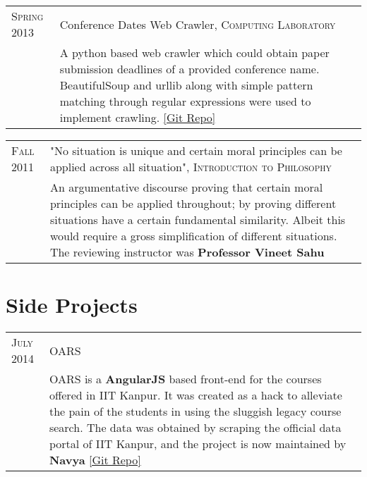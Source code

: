 \documentclass[a4paper,10pt]{article} %
\begin{document}
\begin{tabular}{>{\raggedleft}p{2.2cm}|p{15cm}}
    \textsc{Spring 2013} & Conference Dates Web Crawler, \textsc{Computing Laboratory} \\
                         & \footnotesize{A python based web crawler which could obtain paper submission
                            deadlines of a provided conference name.  BeautifulSoup and urllib along
                            with simple pattern matching through regular expressions were used to implement crawling.
                            \href{https://github.com/srijanshetty/crawler} {[Git Repo]} } \\
\end{tabular}

\begin{tabular}{>{\raggedleft}p{2.2cm}|p{15cm}}
    \textsc{Fall 2011} & "No situation is unique and certain moral principles can be applied across all situation",
                         \textsc{Introduction to Philosophy} \\
                       & \footnotesize{ An argumentative discourse proving that certain moral principles
                         can be applied throughout; by proving different situations have a certain
                         fundamental similarity.  Albeit this would require a gross simplification of
                         different situations.  The reviewing instructor was \textbf{Professor Vineet Sahu}} \\
\end{tabular}

\section{Side Projects}

\begin{tabular}{>{\raggedleft}p{2.2cm}|p{15cm}}
    \textsc{July 2014} & OARS\\
                       & \footnotesize{OARS is a \textbf{AngularJS} based front-end for the
                          courses offered in IIT Kanpur. It was created as a
                          hack to alleviate the pain of the students in using the
                          sluggish legacy course search. The data was obtained by
                          scraping the official data portal of IIT Kanpur, and the
                          project is now maintained by \textbf{Navya}
                          \href{https://github.com/navya/oars} {[Git Repo]} }\\

\end{tabular}
\end{document}
